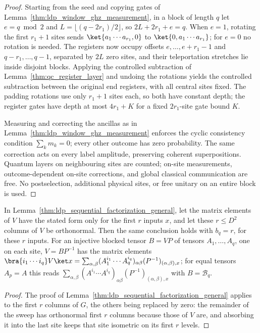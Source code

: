 \begin{proof}
    \leanok
    Starting from the seed and copying gates of
    Lemma~\ref{thm:ldp_window_ghz_measurement}, in a block of length $q$ let
    $e=q\bmod2$ and $L=\lfloor(q-2r_1)/2\rfloor$, so
    $2L+2r_1+e=q$. When $e=1$, rotating the first $r_1+1$ sites sends
    $\ket{a_1\cdots a_{r_1},0}$ to $\ket{0,a_1\cdots a_{r_1}}$; for $e=0$
    no rotation is needed. The registers now occupy offsets
    $e,\ldots,e+r_1-1$ and $q-r_1,\ldots,q-1$, separated by $2L$ zero sites, and
    their teleportation stretches lie inside disjoint blocks. Applying the
    controlled subtraction of Lemma~\ref{thm:qc_register_layer} and undoing
    the rotations yields the controlled
    subtraction between the original end registers, with all central sites
    fixed. The padding rotations use only $r_1+1$ sites each, so both have
    constant depth; the register gates have depth at most $4r_1+K$ for a fixed
    $2r_1$-site gate bound $K$.

    Measuring and correcting the ancillas as in
    Lemma~\ref{thm:ldp_window_ghz_measurement} enforces the cyclic consistency
    condition $\sum_k m_k=0$; every other outcome has zero probability.
    The same correction acts on every label amplitude, preserving coherent
    superpositions. Quantum layers on neighbouring sites are counted;
    on-site measurements, outcome-dependent on-site corrections, and global
    classical communication are free. No postselection, additional physical
    sites, or free unitary on an entire block is used.
\end{proof}

\begin{lemma}
    \label{lem:ldp_sequential_factorization_first_inputs}
    \leanok
    In Lemma~\ref{thm:ldp_sequential_factorization_general}, let the matrix
    elements of $V$ have the stated form only for the first $r$ inputs $x$, and let
    these $r\leq D^2$ columns of $V$ be orthonormal. Then the same conclusion
    holds with $b_q=r$, for these $r$ inputs. For an injective blocked
    tensor $B=VP$ of tensors $A_1,\dots,A_q$, one on each site,
    $V=BP^{-1}$ has the matrix elements
    $\bra{i_1\cdots i_q}V\ket x=\sum_{\alpha,\beta}
        (A_1^{i_1}\cdots A_q^{i_q})_{\alpha\beta}(P^{-1})_{(\alpha,\beta),x}$;
    for equal tensors $A_p=A$ this reads
    $\sum_{\alpha,\beta}(A^{i_1}\cdots A^{i_q})_{\alpha\beta}
        (P^{-1})_{(\alpha,\beta),x}$ with $B=\mathcal B_q$.
\end{lemma}
\begin{proof}
    \leanok
    The proof of Lemma~\ref{thm:ldp_sequential_factorization_general} applies
    to the first $r$ columns of $G$, the others being replaced by zero: the
    remainder of the sweep has orthonormal first $r$ columns because those of
    $V$ are, and absorbing it into the last site keeps that site isometric on
    its first $r$ levels.
\end{proof}

